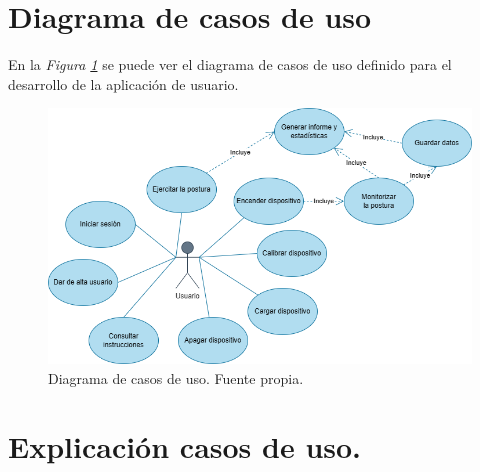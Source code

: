 

\section{Diagrama de casos de uso}
En la \textit{Figura \ref{fig:Casosuso}} se puede ver el diagrama de casos de uso definido para el desarrollo de la aplicación de usuario.

\begin{figure}[h]
    \centering
    \includegraphics[width=1\textwidth]{img/DiagramaCasosDeUso.png}
    \caption{Diagrama de casos de uso. Fuente propia.}
    \label{fig:Casosuso} 
\end{figure}

\section{Explicación casos de uso.}


